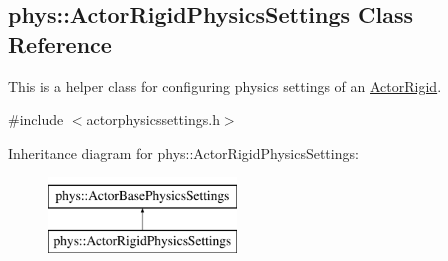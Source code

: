\hypertarget{classphys_1_1ActorRigidPhysicsSettings}{
\subsection{phys::ActorRigidPhysicsSettings Class Reference}
\label{d1/d17/classphys_1_1ActorRigidPhysicsSettings}
}


This is a helper class for configuring physics settings of an \hyperlink{classphys_1_1ActorRigid}{ActorRigid}.  




{\ttfamily \#include $<$actorphysicssettings.h$>$}

Inheritance diagram for phys::ActorRigidPhysicsSettings:\begin{figure}[H]
\begin{center}
\leavevmode
\includegraphics[height=2.000000cm]{d1/d17/classphys_1_1ActorRigidPhysicsSettings}
\end{center}
\end{figure}
